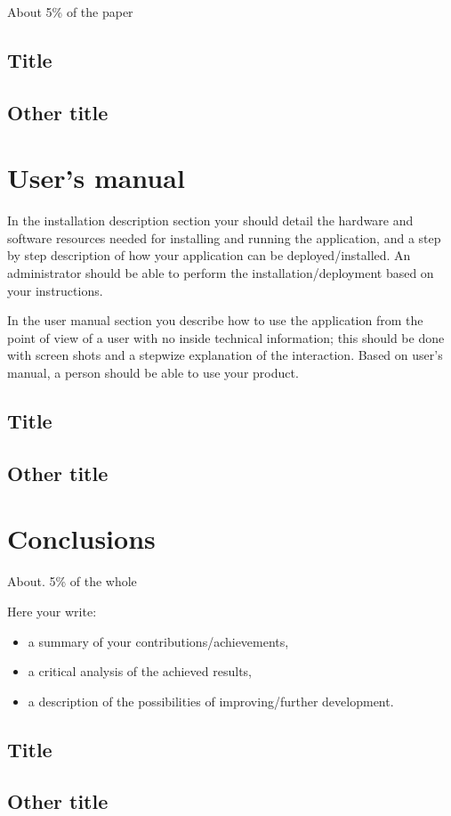 \documentclass[12pt,a4paper,twoside]{report}
\begin{document}
About 5\% of the paper
\section{Title}
\section{Other title}

\chapter{User's manual}

In the installation description section your should detail the hardware and software resources needed for installing and running the application, and a step by step description of how your application can be deployed/installed. An administrator should be able to perform the installation/deployment based on your instructions.

In the user manual section you describe how to use the application from the point of view of a user with no inside technical information; this should be done with screen shots and a stepwize explanation of the interaction. Based on user's manual, a person should be able to use your product.

\section{Title}
\section{Other title}

\chapter{Conclusions}

About. 5\% of the whole

Here your write:
\begin{itemize}
\item a summary of your contributions/achievements,
\item a critical analysis of the achieved results,
\item a description of the possibilities of improving/further development.
\end{itemize}
\section{Title}
\section{Other title}


 


\end{document}
